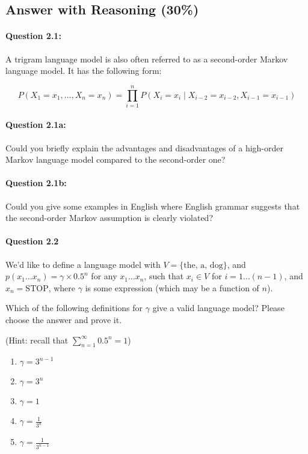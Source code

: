 \documentclass[10pt]{article}
\begin{document}
\subsection{Answer with Reasoning (30\%)}

\paragraph{Question 2.1:} A trigram language model is also often referred to as a second-order Markov language model. It has the following form:

$$
  P\left(X_{1}=x_{1}, \ldots, X_{n}=x_{n}\right)=\prod_{i=1}^{n} P\left(X_{i}=x_{i} \mid X_{i-2}=x_{i-2}, X_{i-1}=x_{i-1}\right)
$$

\paragraph{Question 2.1a:} Could you briefly explain the advantages and disadvantages of a high-order Markov language model compared to the second-order one?

\paragraph{Question 2.1b:} Could you give some examples in English where English grammar suggests that the second-order Markov assumption is clearly violated?



\paragraph{Question 2.2}

We'd like to define a language model with \( V = \{\text{the, a, dog}\} \), and \( p(x_1 \ldots x_n) = \gamma \times 0.5^n \) for any \( x_1 \ldots x_n \), such that \( x_i \in V \) for \( i = 1 \ldots (n - 1) \), and \( x_n = \text{STOP} \), where \( \gamma \) is some expression (which may be a function of \( n \)).

Which of the following definitions for \( \gamma \) give a valid language model? Please choose the answer and prove it.

(Hint: recall that \( \sum_{n=1}^{\infty} 0.5^n = 1 \))

\begin{enumerate}
    \item \( \gamma = 3^{n-1} \)
    \item \( \gamma = 3^n \)
    \item \( \gamma = 1 \)
    \item \( \gamma = \frac{1}{3^n} \)
    \item \( \gamma = \frac{1}{3^{n-1}} \)
\end{enumerate}
\end{document}
